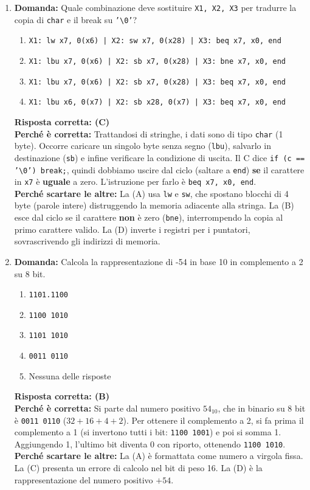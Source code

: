 \documentclass[12pt, a4paper]{article}
\begin{document}
\begin{enumerate}
    \item \textbf{Domanda:} Quale combinazione deve sostituire \texttt{X1, X2, X3} per tradurre la copia di \texttt{char} e il break su \texttt{'\textbackslash0'}?
    \begin{enumerate}[label=(\Alph*)]
        \item \texttt{X1: lw x7, 0(x6) | X2: sw x7, 0(x28) | X3: beq x7, x0, end}
        \item \texttt{X1: lbu x7, 0(x6) | X2: sb x7, 0(x28) | X3: bne x7, x0, end}
        \item \texttt{X1: lbu x7, 0(x6) | X2: sb x7, 0(x28) | X3: beq x7, x0, end}
        \item \texttt{X1: lbu x6, 0(x7) | X2: sb x28, 0(x7) | X3: beq x7, x0, end}
    \end{enumerate}
    \textbf{Risposta corretta: (C)} \\
    \textbf{Perché è corretta:} Trattandosi di stringhe, i dati sono di tipo \texttt{char} (1 byte). Occorre caricare un singolo byte senza segno (\texttt{lbu}), salvarlo in destinazione (\texttt{sb}) e infine verificare la condizione di uscita. Il C dice \texttt{if (c == '\textbackslash0') break;}, quindi dobbiamo uscire dal ciclo (saltare a \texttt{end}) \textbf{se} il carattere in \texttt{x7} è \textbf{uguale} a zero. L'istruzione per farlo è \texttt{beq x7, x0, end}. \\
    \textbf{Perché scartare le altre:} La (A) usa \texttt{lw} e \texttt{sw}, che spostano blocchi di 4 byte (parole intere) distruggendo la memoria adiacente alla stringa. La (B) esce dal ciclo se il carattere \textbf{non} è zero (\texttt{bne}), interrompendo la copia al primo carattere valido. La (D) inverte i registri per i puntatori, sovrascrivendo gli indirizzi di memoria.

    \item \textbf{Domanda:} Calcola la rappresentazione di -54 in base 10 in complemento a 2 su 8 bit.
    \begin{enumerate}[label=(\Alph*)]
        \item \texttt{1101.1100}
        \item \texttt{1100 1010}
        \item \texttt{1101 1010}
        \item \texttt{0011 0110}
        \item Nessuna delle risposte
    \end{enumerate}
    \textbf{Risposta corretta: (B)} \\
    \textbf{Perché è corretta:} Si parte dal numero positivo $54_{10}$, che in binario su 8 bit è \texttt{0011 0110} ($32+16+4+2$). Per ottenere il complemento a 2, si fa prima il complemento a 1 (si invertono tutti i bit: \texttt{1100 1001}) e poi si somma 1. Aggiungendo 1, l'ultimo bit diventa 0 con riporto, ottenendo \texttt{1100 1010}. \\
    \textbf{Perché scartare le altre:} La (A) è formattata come numero a virgola fissa. La (C) presenta un errore di calcolo nel bit di peso 16. La (D) è la rappresentazione del numero positivo $+54$.


\end{enumerate}
\end{document}
